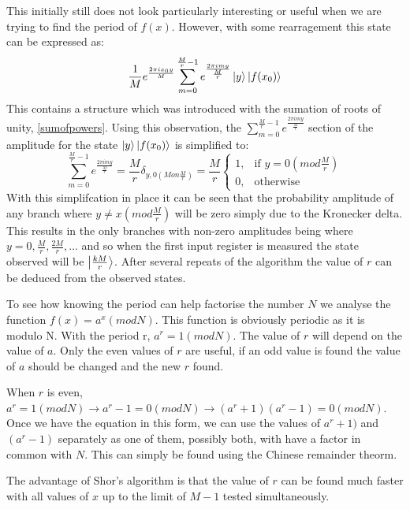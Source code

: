 \documentclass[authoryearcitations]{UoYCSproject}
\begin{document}
This initially still does not look particularly interesting or useful when we are trying to find the period of $f(x)$.
However, with some rearragement this state can be expressed as:
\begin{equation}
 \frac{1}{M}e^{\frac{2\pi{i}x_0y}{M}}\sum_{m=0}^{\frac{M}{r}-1}e^{\frac{2\pi{i}my}{\frac{M}{r}}}\left\vert{y}\right\rangle\left\vert{f(x_0)}\right\rangle
\end{equation}
This contains a structure which was introduced with the sumation of roots of unity, \ref{sumofpowers}.
Using this observation, the $\sum_{m=0}^{\frac{M}{r}-1}e^{\frac{2\pi{i}my}{\frac{M}{r}}}$ section of the amplitude for the state $\left\vert{y}\right\rangle\left\vert{f(x_0)}\right\rangle$ is simplified to:
\begin{equation}
 \sum_{m=0}^{\frac{M}{r}-1}e^{\frac{2\pi{i}my}{\frac{M}{r}}}=\frac{M}{r}\delta_{y,0 (Mon\frac{M}{r})}=\frac{M}{r}
\left\{
  \begin{array}{cc} 1, & \mbox{if } y={0} (mod\frac{M}{r})\\ 
  0, & \mbox{otherwise}\end{array}
\right.
\end{equation}
With this simplifcation in place it can be seen that the probability amplitude of any branch where $y\neq{x}(mod\frac{M}{r})$ will be zero simply due to the Kronecker delta.
This results in the only branches with non-zero amplitudes being where $y=0,\frac{M}{r},\frac{2M}{r},\dots$ and so when the first input register is measured the state observed will be $\left\vert{\frac{kM}{r}}\right\rangle$.
After several repeats of the algorithm the value of $r$ can be deduced from the observed states.

To see how knowing the period can help factorise the number $N$ we analyse the function $f(x)=a^x(mod N)$.
This function is obviously periodic as it is modulo N.
With the period r, $a^r=1(mod N)$.
The value of $r$ will depend on the value of $a$.
Only the even values of $r$ are useful, if an odd value is found the value of $a$ should be changed and the new $r$ found.

When $r$ is even, $a^r=1(mod N) \rightarrow a^r-1=0(mod N) \rightarrow (a^r+1)(a^r-1)=0(mod N)$.
Once we have the equation in this form, we can use the values of $a^r+1)$ and $(a^r-1)$ separately as one of them, possibly both, with have a factor in common with $N$.
This can simply be found using the Chinese remainder theorm.

The advantage of Shor's algorithm is that the value of $r$ can be found much faster with all values of $x$ up to the limit of $M-1$ tested simultaneously.
\end{document}

